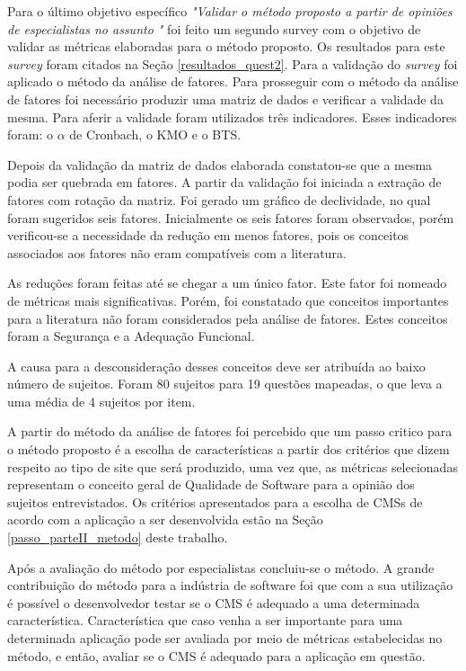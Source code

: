 Para o último objetivo específico \textit{"Validar o método proposto a partir de opiniões de especialistas no assunto "} foi feito um segundo survey com o objetivo de validar as métricas elaboradas para o método proposto. Os resultados para este \textit{survey} foram citados na Seção \ref{resultados_quest2}. Para a validação do \textit{survey} foi aplicado o método da análise de fatores. Para prosseguir com o método da análise  de fatores foi necessário produzir uma matriz de dados e verificar a validade da mesma. Para aferir a validade foram utilizados três indicadores. Esses indicadores foram: o $\alpha$ de Cronbach, o KMO e o BTS. 

Depois da validação da matriz de dados elaborada constatou-se que a mesma podia ser quebrada em fatores. A partir da validação foi iniciada a extração de fatores com rotação da matriz. Foi gerado um gráfico de declividade, no qual foram sugeridos seis fatores. Inicialmente os seis fatores foram observados, porém verificou-se a necessidade da redução em menos fatores, pois os conceitos associados aos fatores não eram compatíveis com a literatura.

As reduções foram feitas até se chegar a um único fator. Este fator foi nomeado de métricas mais significativas. Porém, foi constatado que conceitos importantes para a literatura não foram considerados pela análise de fatores. Estes conceitos foram a Segurança e a Adequação Funcional.    

A causa para a desconsideração desses conceitos deve ser atribuída ao baixo número de sujeitos. Foram 80 sujeitos para 19 questões mapeadas, o que leva a uma média de 4 sujeitos por item.  

A partir do método da análise de fatores foi percebido que um passo critico para o método proposto é a escolha de características a partir dos critérios
que dizem respeito ao tipo de site que será produzido, uma vez que, as métricas selecionadas representam o conceito geral de Qualidade de Software para a opinião dos sujeitos entrevistados. Os critérios apresentados para a escolha de CMSs de acordo com a aplicação a ser desenvolvida estão na Seção \ref{passo_parteII_metodo} deste trabalho.   


Após a avaliação do método por especialistas concluiu-se o método. A grande contribuição do método para a indústria de software foi que com a sua utilização é possível o desenvolvedor testar se o CMS é adequado a uma determinada característica. Característica que caso venha a ser importante para uma determinada aplicação pode ser avaliada por meio de métricas estabelecidas no método, e então, avaliar se o CMS é adequado para a aplicação em questão. 

